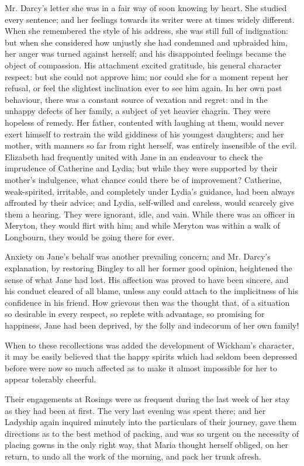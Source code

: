 \documentclass[12pt,openright]{book}
\begin{document}
Mr. Darcy’s letter she was in a fair way of soon knowing by heart. She studied every sentence; and her feelings towards its writer were at times widely different. When she remembered the style of his address, she was still full of indignation: but when she considered how unjustly she had condemned and upbraided him, her anger was turned against herself; and his disappointed feelings became the object of compassion. His attachment excited gratitude, his general character respect: but she could not approve him; nor could she for a moment repent her refusal, or feel the slightest inclination ever to see him again. In her own past behaviour, there was a constant source of vexation and regret: and in the unhappy defects of her family, a subject of yet heavier chagrin. They were hopeless of remedy. Her father, contented with laughing at them, would never exert himself to restrain the wild giddiness of his youngest daughters; and her mother, with manners so far from right herself, was entirely insensible of the evil. Elizabeth had frequently united with Jane in an endeavour to check the imprudence of Catherine and Lydia; but while they were supported by their mother’s indulgence, what chance could there be of improvement? Catherine, weak-spirited, irritable, and completely under Lydia’s guidance, had been always affronted by their advice; and Lydia, self-willed and careless, would scarcely give them a hearing. They were ignorant, idle, and vain. While there was an officer in Meryton, they would flirt with him; and while Meryton was within a walk of Longbourn, they would be going there for ever.

Anxiety on Jane’s behalf was another prevailing concern; and Mr. Darcy’s explanation, by restoring Bingley to all her former good opinion, heightened the sense of what Jane had lost. His affection was proved to have been sincere, and his conduct cleared of all blame, unless any could attach to the implicitness of his confidence in his friend. How grievous then was the thought that, of a situation so desirable in every respect, so replete with advantage, so promising for happiness, Jane had been deprived, by the folly and indecorum of her own family!

When to these recollections was added the development of Wickham’s character, it may be easily believed that the happy spirits which had seldom been depressed before were now so much affected as to make it almost impossible for her to appear tolerably cheerful.

Their engagements at Rosings were as frequent during the last week of her stay as they had been at first. The very last evening was spent there; and her Ladyship again inquired minutely into the particulars of their journey, gave them directions as to the best method of packing, and was so urgent on the necessity of placing gowns in the only right way, that Maria thought herself obliged, on her return, to undo all the work of the morning, and pack her trunk afresh.
\end{document}

